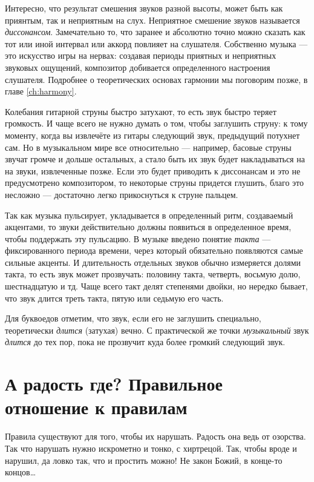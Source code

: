 Интересно, что результат смешения звуков разной высоты, может быть как приянтым, так и неприятным на слух. Неприятное смешение звуков называется \emph{диссонансом}. Замечательно то, что заранее и абсолютно точно можно сказать как тот или иной интервал или аккорд повлияет на слушателя. Собственно музыка --- это искусство игры на нервах: создавая периоды приятных и неприятных звуковых ощущений, композитор добивается определенного настроения слушателя. Подробнее о теоретических основах гармонии мы поговорим позже, в главе \ref{ch:harmony}.

Колебания гитарной струны быстро затухают, то есть звук быстро теряет громкость. И чаще всего не нужно думать о том, чтобы заглушить струну: к тому моменту, когда вы извлечёте из гитары следующий звук, предыдущий потухнет сам. Но в музыкальном мире все относительно --- например, басовые струны звучат громче и дольше остальных, а стало быть их звук будет накладываться на на звуки, извлеченные позже. Если это будет приводить к диссонансам и это не предусмотрено композитором, то некоторые струны придется глушить, благо это несложно --- достаточно легко прикоснуться к струне пальцем.

Так как музыка пульсирует, укладывается в определенный ритм, создаваемый акцентами, то звуки действительно должны появиться в определенное время, чтобы поддержать эту пульсацию. В музыке введено понятие \emph{такта} --- фиксированного периода времени, через который обязательно появляются самые сильные акценты. И длительность отдельных звуков обычно измеряется долями такта, то есть звук может прозвучать: половину такта, четверть, восьмую долю, шестнадцатую и тд. Чаще всего такт делят степенями двойки, но нередко бывает, что звук длится треть такта, пятую или седьмую его часть.

Для буквоедов отметим, что звук, если его не заглушить специально, теоретически \emph{длится} (затухая) вечно. С практической же точки \emph{музыкальный} звук \emph{длится} до тех пор, пока не прозвучит куда более громкий следующий звук. 


\section{А радость где? Правильное отношение к правилам}
\label{ch:music:rules}

Правила существуют для того, чтобы их нарушать. Радость она ведь от озорства. Так что нарушать нужно искрометно и тонко, с хиртрецой. Так, чтобы вроде и нарушил, да ловко так, что и простить можно! Не закон Божий, в конце-то концов\ldots

